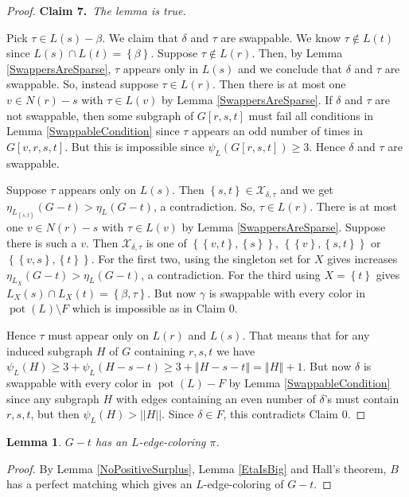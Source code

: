 \documentclass[12pt]{article}
\theoremstyle{plain}
\newtheorem{lem}[thm]{Lemma}
\theoremstyle{definition}
\theoremstyle{remark}
\newcommand{\fancy}[1]{\mathcal{#1}}
\newcommand{\set}[1]{\left\{ #1 \right\}}
\newcommand{\size}[1]{\left\Vert#1\right\Vert}
\newcommand{\pot}{\operatorname{pot}}
\def\X{\fancy{X}}
\newcommand{\claim}[2]{{\bf Claim #1.}~{\it #2}~~}
\begin{document}
\begin{proof}
		\claim{7}{The lemma is true.}
		
			Pick $\tau \in L(s) - \beta$.   We claim that $\delta$ and $\tau$ are swappable.  We know $\tau \not \in L(t)$ since $L(s) \cap L(t) = \set{\beta}$.  Suppose $\tau \not \in L(r)$.  Then, by Lemma \ref{SwappersAreSparse}, $\tau$ appears only in $L(s)$ and we conclude that $\delta$ and $\tau$ are swappable.  So, instead suppose $\tau \in L(r)$.  Then there is at most one $v \in N(r) - s$ with $\tau \in L(v)$ by Lemma \ref{SwappersAreSparse}.  If $\delta$ and $\tau$ are not swappable, then some subgraph of $G[r,s,t]$ must fail all conditions in Lemma \ref{SwappableCondition} since $\tau$ appears an odd number of times in $G[v,r,s,t]$.  But this is impossible since $\psi_L(G[r,s,t]) \ge 3$.  Hence $\delta$ and $\tau$ are swappable.
			
			Suppose $\tau$ appears only on $L(s)$. Then $\set{s,t} \in \X_{\delta,\tau}$ and we get $\eta_{L_{\set{s,t}}}(G - t) > \eta_L(G - t)$, a contradiction.  So, $\tau \in L(r)$.  There is at most one $v \in N(r) - s$ with $\tau \in L(v)$ by Lemma \ref{SwappersAreSparse}.  Suppose there is such a $v$.  Then $\X_{\delta,\tau}$ is one of $\set{\set{v,t}, \set{s}}$, $\set{\set{v}, \set{s, t}}$ or $\set{\set{v,s}, \set{t}}$.  For the first two, using the singleton set for $X$ gives increases $\eta_{L_X}(G - t) > \eta_L(G - t)$, a contradiction.  For the third using $X = \set{t}$ gives $L_X(s) \cap L_X(t) = \set{\beta, \tau}$.  But now $\gamma$ is swappable with every color in $\pot(L) \setminus F$ which is impossible as in Claim 0.  
			
			Hence $\tau$ must appear only on $L(r)$ and $L(s)$.  That means that for any induced subgraph $H$ of $G$ containing $r,s,t$ we have $\psi_L(H) \ge 3 + \psi_L(H-s-t) \ge 3 + \size{H-s-t} = \size{H} + 1$.  But now $\delta$ is swappable with every color in $\pot(L) - F$ by Lemma \ref{SwappableCondition} since any subgraph $H$ with edges containing an even number of $\delta$'s must contain $r,s,t$, but then $\psi_L(H) > ||H||$.  Since $\delta \in F$, this contradicts Claim 0.
	\end{proof}
	
	
	\begin{lem}\label{CanColorG-t}
		$G-t$ has an $L$-edge-coloring $\pi$.
	\end{lem}
	\begin{proof}
		By Lemma \ref{NoPositiveSurplus}, Lemma \ref{EtaIsBig} and Hall's theorem, $B$ has a perfect matching which gives an $L$-edge-coloring of $G-t$.
	\end{proof}
\end{document}
